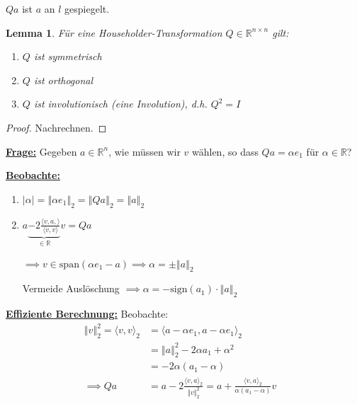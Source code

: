 \documentclass{book}
\newtheorem{lemma}[algorithm]{Lemma}
\def\R{\mathbb{R}}
\begin{document}
        $Qa$ ist $a$ an $l$ gespiegelt.

        \begin{lemma}\label{l2.17}
            Für eine Householder-Transformation $Q\in\R^{n\times n}$ gilt:
            \begin{enumerate}
                \item $Q$ ist symmetrisch
                \item $Q$ ist orthogonal
                \item $Q$ ist involutionisch (eine Involution), d.h. $Q^2=I$
            \end{enumerate}
        \end{lemma}
        \begin{proof} %
            Nachrechnen.
        \end{proof}

        \underline{\textbf{Frage:}} Gegeben $a\in\R^n$, wie müssen wir $v$ wählen, so dass $Qa=\alpha e_1$ für $\alpha\in\R$?


        \underline{\textbf{Beobachte:}}

        \begin{enumerate}
            \item $\left\vert \alpha \right\vert=\left\Vert \alpha e_1 \right\Vert_2 = \left\Vert Qa \right\Vert_2 = \left\Vert a \right\Vert_2$
            \item $a\underbrace{-2\frac{\langle v,a, \rangle}{\langle v,v \rangle}}_{\in\R}v=Qa$
        
            $\implies v\in\text{span}(\alpha e_1-a) \implies \alpha =\pm\left\Vert a \right\Vert_2$ %

            Vermeide Auslöschung $\implies \alpha=-\text{sign}(a_1)\cdot\left\Vert a \right\Vert_2$
        \end{enumerate}

        \underline{\textbf{Effiziente Berechnung:}} Beobachte:
        \begin{align*}
            \left\Vert v \right\Vert_2^2 = \langle v,v \rangle_2 &= \langle  a-\alpha e_1, a-\alpha e_1  \rangle_2&\\
            &=\left\Vert a \right\Vert_2^2-2\alpha a_1 +\alpha^2&\\
            &=-2\alpha(a_1-\alpha)&\\
            \implies Qa &= a-2\frac{\langle v,a \rangle_2}{\left\Vert v \right\Vert_2^2}=a+\frac{\langle v,a \rangle_2}{\alpha(a_1-\alpha)}v&
        \end{align*}
\end{document}

